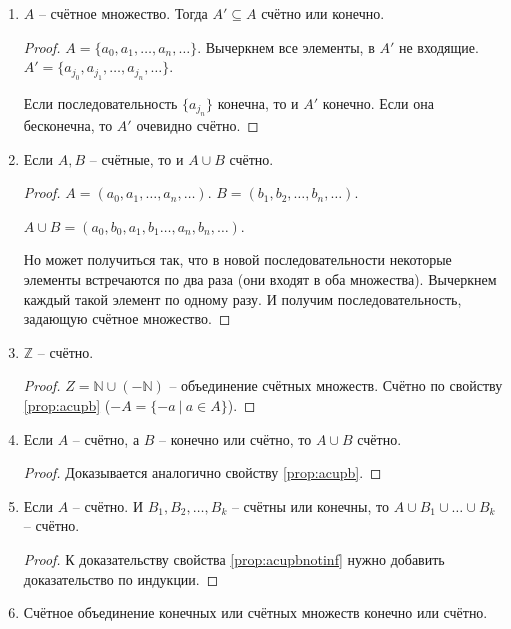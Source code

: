\documentclass[a4paper, 12pt]{article}
\newcommand{\Z}{\mathbb{Z}}
\newcommand{\N}{\mathbb{N}}
\begin{document}
\begin{enumerate}
        \item
            \label{prop:AsubsetA}
            $A$ -- счётное множество. Тогда $A' \subseteq A$ счётно или конечно.
            \begin{proof}
                $A = \{a_0, a_1, \ldots, a_n, \ldots\}$. Вычеркнем все элементы, в $A'$
                не входящие. $A' = \{a_{j_0}, a_{j_1}, \ldots, a_{j_n}, \ldots\}$.

                Если последовательность $\{a_{j_n}\}$ конечна, то и $A'$ конечно.
                Если она бесконечна, то $A'$ очевидно счётно.
            \end{proof}
        \item 
            \label{prop:acupb}
            Если $A,B$ -- счётные, то и $A \cup B$ счётно.
            \begin{proof}
                $A = (a_0, a_1, \ldots, a_n, \ldots)$. 
                $B = (b_1, b_2, \ldots, b_n, \ldots)$.

                $A \cup B = (a_0, b_0, a_1, b_1 \ldots, a_n, b_n, \ldots)$.

                Но может получиться так, что в новой последовательности некоторые элементы
                встречаются по два раза (они входят в оба множества). Вычеркнем
                каждый такой элемент по одному разу. И получим последовательность,
                задающую счётное множество.
            \end{proof}
        \item $\Z$ -- счётно.
            \begin{proof}
                $Z = \N \cup (-\N)$ -- объединение счётных множеств. Счётно по свойству
                \ref{prop:acupb} ($-A = \{-a \ |\ a \in A\}$).
            \end{proof}
        \item 
            \label{prop:acupbnotinf}
            Если $A$ -- счётно, а $B$ -- конечно или счётно, то $A \cup B$ счётно.
            \begin{proof}
                Доказывается аналогично свойству \ref{prop:acupb}.
            \end{proof}
       \item Если $A$ -- счётно. И $B_1, B_2, \ldots, B_k$ -- счётны или конечны, то
            $A \cup B_1 \cup \ldots \cup B_k$ -- счётно.
            \begin{proof}
                К доказательству свойства \ref{prop:acupbnotinf} нужно добавить
                доказательство по индукции.
            \end{proof}
       \item
           \label{prop:Fsetcup}
           Счётное объединение конечных или счётных множеств конечно или счётно.


\end{enumerate}
\end{document}
